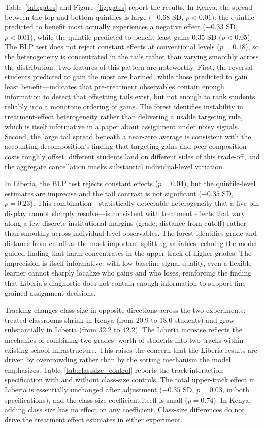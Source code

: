 \documentclass[11pt]{article}
\begin{document}
Table~\ref{tab:gates} and Figure~\ref{fig:gates} report the results. In Kenya, the spread between the top and bottom quintiles is large ($-0.68$ SD, $p < 0.01$): the quintile predicted to benefit most actually experiences a negative effect ($-0.33$ SD, $p < 0.01$), while the quintile predicted to benefit least gains $0.35$ SD ($p < 0.05$). The BLP test does not reject constant effects at conventional levels ($p = 0.18$), so the heterogeneity is concentrated in the tails rather than varying smoothly across the distribution. Two features of this pattern are noteworthy. First, the reversal---students predicted to gain the most are harmed, while those predicted to gain least benefit---indicates that pre-treatment observables contain enough information to detect that offsetting tails exist, but not enough to rank students reliably into a monotone ordering of gains. The forest identifies instability in treatment-effect heterogeneity rather than delivering a usable targeting rule, which is itself informative in a paper about assignment under noisy signals. Second, the large tail spread beneath a near-zero average is consistent with the accounting decomposition's finding that targeting gains and peer-composition costs roughly offset: different students land on different sides of this trade-off, and the aggregate cancellation masks substantial individual-level variation.

In Liberia, the BLP test rejects constant effects ($p=0.04$), but the quintile-level estimates are imprecise and the tail contrast is not significant ($-0.35$ SD, $p = 0.23$). This combination---statistically detectable heterogeneity that a five-bin display cannot sharply resolve---is consistent with treatment effects that vary along a few discrete institutional margins (grade, distance from cutoff) rather than smoothly across individual-level observables. The forest identifies grade and distance from cutoff as the most important splitting variables, echoing the model-guided finding that harm concentrates in the upper track of higher grades. The imprecision is itself informative: with low baseline signal quality, even a flexible learner cannot sharply localize who gains and who loses, reinforcing the finding that Liberia's diagnostic does not contain enough information to support fine-grained assignment decisions.

Tracking changes class size in opposite directions across the two experiments: treated classrooms shrink in Kenya (from 20.9 to 18.0 students) and grow substantially in Liberia (from 32.2 to 42.2). The Liberia increase reflects the mechanics of combining two grades' worth of students into two tracks within existing school infrastructure. This raises the concern that the Liberia results are driven by overcrowding rather than by the sorting mechanism the model emphasizes. Table~\ref{tab:classsize_control} reports the track-interaction specification with and without class-size controls. The total upper-track effect in Liberia is essentially unchanged after adjustment ($-0.35$ SD, $p = 0.03$, in both specifications), and the class-size coefficient itself is small ($p = 0.74$). In Kenya, adding class size has no effect on any coefficient. Class-size differences do not drive the treatment effect estimates in either experiment.
\end{document}

